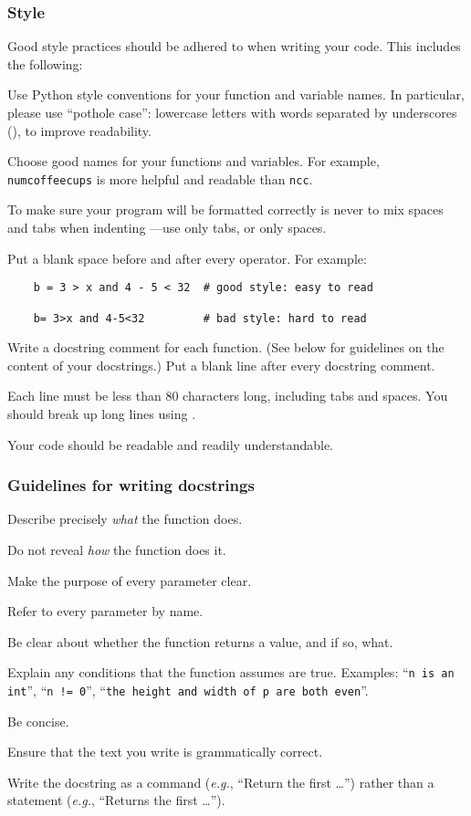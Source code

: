 \documentclass[11pt]{article}
\let\code\texttt
\let\latinabb\emph
\newcommand*{\eg}{\latinabb{e.g.}}
\newcommand*{\txtbksl} {\symbol{"5C}}%
\newcommand*{\txtunder}{\symbol{"5F}}%
\let\ezimeti\itemize
\let\ezimetidne\enditemize
\renewenvironment{itemize}
   {\ezimeti
    \setlength{\topsep}{.25ex plus .125ex minus .1825ex}%
    \setlength{\itemsep}{\topsep}\setlength{\parsep}{0ex}%
    \setlength{\leftmargin}{1.75em}\setlength{\labelsep}{.5em}%
    \setlength{\labelwidth}{1.75em}\ignorespaces}
   {\ezimetidne}
\newcommand*{\heading}[1]{\subsubsection*{#1}}
\begin{document}
\heading{Style}

Good style practices should be adhered to when writing your code.  This 
includes the following:
\begin{itemize}
\item
    Use Python style conventions for your function and variable names.  In 
    particular, please use ``pothole case'': lowercase letters with words 
    separated by underscores (\code{\txtunder}), to improve readability.
\item
    Choose good names for your functions and variables.  For example, 
    \code{num\txtunder coffee\txtunder cups} is more helpful and readable 
    than \code{ncc}.
\item
    To make sure your program will be formatted correctly is never 
    to mix spaces and tabs when indenting ---use only tabs, or only spaces.
\item
    Put a blank space before and after every operator.  For example:
\begin{verbatim}
    b = 3 > x and 4 - 5 < 32  # good style: easy to read
    
    b= 3>x and 4-5<32         # bad style: hard to read
\end{verbatim}
\item
    Write a docstring comment for each function.  (See below for guidelines 
    on the content of your docstrings.) 
    Put a blank line after every docstring comment.
\item
    Each line must be less than 80 characters long, including tabs and 
    spaces.  You should break up long lines using \code{\txtbksl}. 
\item
    Your code should be readable and readily understandable.
\end{itemize}

\heading{Guidelines for writing docstrings}

\begin{itemize}
\item  Describe precisely \emph{what} the function does.
\item  Do not reveal \emph{how} the function does it.
\item  Make the purpose of every parameter clear.
\item  Refer to every parameter by name.
\item  Be clear about whether the function returns a value, and if so, 
    what.
\item  Explain any conditions that the function assumes are true.  
    Examples: ``\code{n is an int}'', ``\verb|n != 0|'', ``\code{the height 
    and width of p are both even}''.
\item  Be concise.
\item  Ensure that the text you write is grammatically correct.
\item  Write the docstring as a command (\eg, ``Return the first \ldots'') 
    rather than a statement (\eg, ``Returns the first \ldots'').
\end{itemize}
\end{document}
